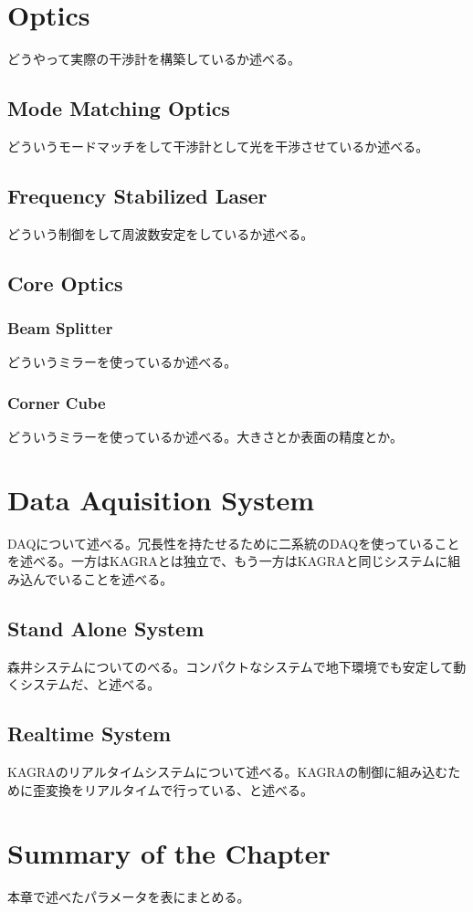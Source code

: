 \section{Optics} %
どうやって実際の干渉計を構築しているか述べる。
\subsection{Mode Matching Optics}
どういうモードマッチをして干渉計として光を干渉させているか述べる。
\subsection{Frequency Stabilized Laser}
どういう制御をして周波数安定をしているか述べる。
\subsection{Core Optics}
\subsubsection{Beam Splitter}
どういうミラーを使っているか述べる。
\subsubsection{Corner Cube}
どういうミラーを使っているか述べる。大きさとか表面の精度とか。




\section{Data Aquisition System} %
DAQについて述べる。冗長性を持たせるために二系統のDAQを使っていることを述べる。一方はKAGRAとは独立で、もう一方はKAGRAと同じシステムに組み込んでいることを述べる。
\subsection{Stand Alone System}
森井システムについてのべる。コンパクトなシステムで地下環境でも安定して動くシステムだ、と述べる。
\subsection{Realtime System}
KAGRAのリアルタイムシステムについて述べる。KAGRAの制御に組み込むために歪変換をリアルタイムで行っている、と述べる。




\section{Summary of the Chapter} %
本章で述べたパラメータを表にまとめる。
